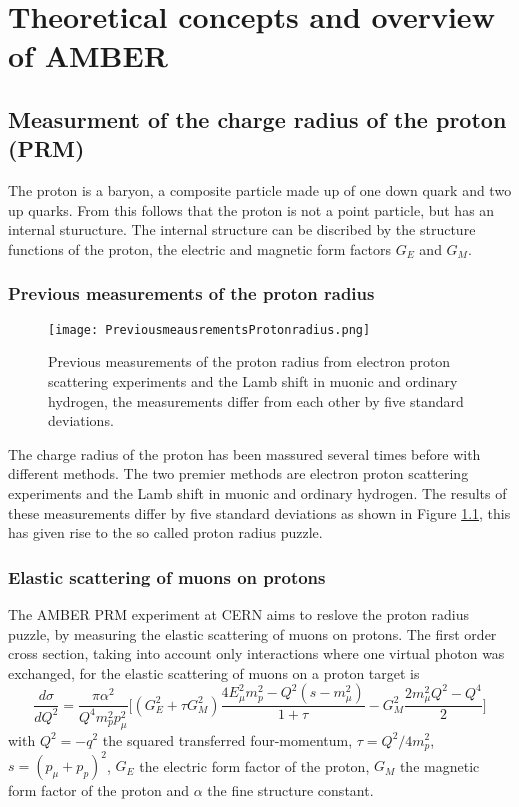 \chapter{Theoretical concepts and overview of AMBER}\label{cha:theory}
%

\section{Measurment of the charge radius of the proton (PRM)}\label{sec:proton_radius}
The proton is a baryon, a composite particle made up of one down quark and  two up quarks.
From this follows that the proton is not a point particle, but has an internal sturucture.
\newline
The internal structure can be discribed by the structure functions of the proton, 
the electric and magnetic form factors $G_E$ and $G_M$. \autocite{ProposalAmber}	
\subsection{Previous measurements of the proton radius}
\begin{figure}[h]
	\centering
	\texttt{[image: PreviousmeausrementsProtonradius.png]}
	\caption{Previous measurements of the proton radius from electron proton  scattering experiments and the Lamb shift in muonic and ordinary hydrogen,
	 the measurements differ from each other by five standard deviations. \autocite{ProposalAmber} }
	\label{fig:previous_proton_radius}
\end{figure}

The charge radius of the proton has been massured several times before with different methods.
The two premier methods are electron proton scattering experiments and the Lamb shift in muonic and ordinary hydrogen.
The results of these measurements differ by five standard deviations as shown in Figure \ref{fig:previous_proton_radius},
this has given rise to the so called proton radius puzzle. \autocite{ProposalAmber}

\subsection{Elastic scattering of muons on protons}
The AMBER PRM experiment at CERN aims to reslove the proton radius puzzle, by measuring the elastic scattering of muons on protons.
The first order cross section, taking into account only interactions where one virtual photon was exchanged, 
for the elastic scattering of muons on a proton target is 
\begin{equation}
\label{eq:cross_section}
\frac{d\sigma}{dQ^2} = \frac{\pi \alpha^2}{Q^4 m_p^2 p_\mu^2} \bigg[ \left( G_E^2 + \tau G_M^2 \right) \frac{ 4E_\mu^2 m_p^2 
- Q^2 (s - m_\mu^2)}{1 + \tau }  - G_M^2 \frac{ 2m_\mu^2 Q^2 - Q^4}{2} \bigg]
\end{equation}
with  $Q^2 = -q^2$ 	the squared transferred four-momentum, $\tau = Q^2 / 4m_p^2$, $s = (p_\mu + p_p)^2$, 
 $G_E$ the electric form factor of the proton,
  $G_M$ the magnetic form factor of the proton and $\alpha$ the fine structure constant. \autocite{intentAmber}
  
